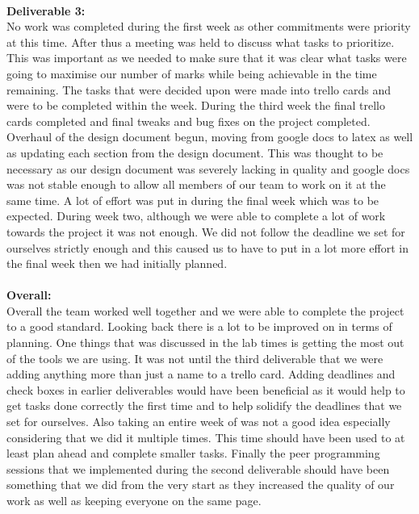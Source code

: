 \\
\textbf{Deliverable 3:\\}
No work was completed during the first week as other commitments were priority at this time. After thus a meeting was held to discuss what tasks to prioritize. This was important as we needed to make sure that it was clear what tasks were going to maximise our number of marks while being achievable in the time remaining. The tasks that were decided upon were made into trello cards and were to be completed within the week. During the third week the final trello cards completed and final tweaks and bug fixes on the project completed. Overhaul of the design document begun, moving from google docs to latex as well as updating each section from the design document. This was thought to be necessary as our design document was severely lacking in quality and google docs was not stable enough to allow all members of our team to work on it at the same time. A lot of effort was put in during the final week which was to be expected. During week two, although we were able to complete a lot of work towards the project it was not enough. We did not follow the deadline we set for ourselves strictly enough and this caused us to have to put in a lot more effort in the final week then we had initially planned.  \\
\\
\textbf{Overall:\\}
Overall the team worked well together and we were able to complete the project to a good standard. Looking back there is a lot to be improved on in terms of planning. One things that was discussed in the lab times is getting the most out of the tools we are using. It was not until the third deliverable that we were adding anything more than just a name to a trello card. Adding deadlines and check boxes in earlier deliverables would have been beneficial as it would help to get tasks done correctly the first time and to help solidify the deadlines that we set for ourselves. Also taking an entire week of was not a good idea especially considering that we did it multiple times. This time should have been used to at least plan ahead and complete smaller tasks. Finally the peer programming sessions that we implemented during the second deliverable should have been something that we did from the very start as they increased the quality of our work as well as keeping everyone on the same page.\\
\\
